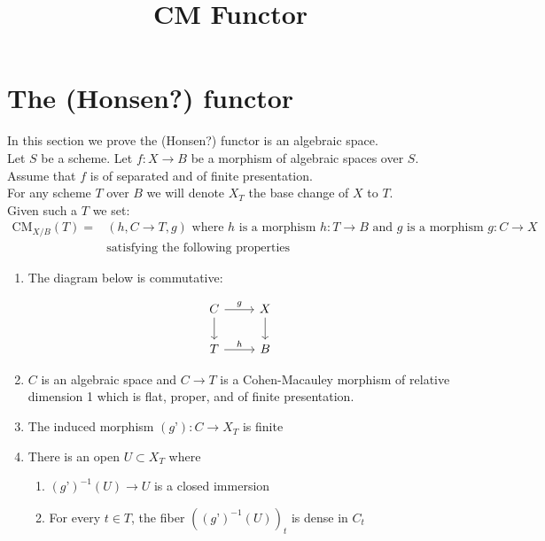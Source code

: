 \documentclass{article}
\title{
    \textmd{\textbf{CM Functor}}\\
}
\author{}
\date{}
\theoremstyle{definition}
\theoremstyle{theorem}
\theoremstyle{remark}
\theoremstyle{definition}
\newcommand{\CMfunctor}{\text{CM}}
\begin{document}
\maketitle

\section{The (Honsen?) functor}
\label{section-cm}

\noindent
In this section we prove the (Honsen?) functor is an algebraic space.\\

Let $S$ be a scheme. Let $f : X \to B$ be a morphism of
algebraic spaces over $S$. Assume that $f$ is of separated and of finite presentation.\\

For any scheme $T$ over $B$ we will denote $X_T$ the base change of $X$ to $T$.\\

Given such a $T$ we set:
\begin{align*}
\CMfunctor_{X/B}(T) = & (h, C \to T, g)  \text{ where } 
h \text{ is a morphism } h : T \to B \text{ and } g \text{ is a morphism } g : C \to X \\ & \text{satisfying the following properties}
\end{align*}
\begin{enumerate}
\item The diagram below is commutative: 

\[ \begin{tikzcd}
C \arrow{r}{g} \arrow{d} & X \arrow{d} \\%
T \arrow{r}{h}& B
\end{tikzcd}
\]

\item $C$ is an algebraic space and $C \to T$ is a Cohen-Macauley morphism of relative dimension 1 which is flat, proper, and of finite presentation.
\item The induced morphism $(g’) : C \to X_T$ is finite
\item There is an open $U \subset X_T$ where
\begin{enumerate}
\item $(g’)^{-1}(U) \to U$ is a closed immersion
\item For every $t \in T$, the fiber $\left((g’)^{-1}(U)\right)_t$ is dense in $C_t$
\end{enumerate}
\end{enumerate}
\end{document}
